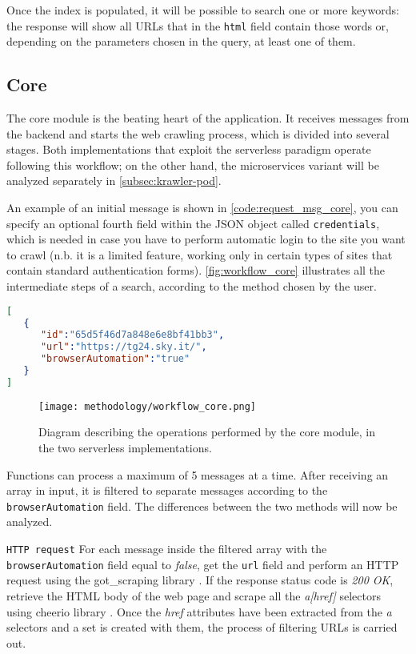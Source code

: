 \documentclass[../thesis.tex]{subfiles}
\begin{document}
Once the index is populated, it will be possible to search one or more keywords: the response will show all \acrshort{URL}s that in the \texttt{html} field contain those words or, depending on the parameters chosen in the query, at least one of them.

\subsection{Core}
The core module is the beating heart of the application. It receives messages from the backend and starts the web crawling process, which is divided into several stages. Both implementations that exploit the serverless paradigm operate following this workflow; on the other hand, the microservices variant will be analyzed separately in \autoref{subsec:krawler-pod}.

An example of an initial message is shown in \autoref{code:request_msg_core}, you can specify an optional fourth field within the \acrshort{JSON} object called \texttt{credentials}, which is needed in case you have to perform automatic login to the site you want to crawl (n.b. it is a limited feature, working only in certain types of sites that contain standard authentication forms). \autoref{fig:workflow_core} illustrates all the intermediate steps of a search, according to the method chosen by the user.

\begin{lstlisting}[language=json, captionpos=b, caption={[Sample initial message for the core]Example of an initial message received by the core module.}, label={code:request_msg_core}]
[
   {
      "id":"65d5f46d7a848e6e8bf41bb3",
      "url":"https://tg24.sky.it/",
      "browserAutomation":"true"
   }
]
\end{lstlisting}

\begin{figure}[H]
    \centering
    \texttt{[image: methodology/workflow\_core.png]}
    \caption[Core module workflow]{Diagram describing the operations performed by the core module, in the two serverless implementations.}
    \label{fig:workflow_core}
\end{figure}

Functions can process a maximum of 5 messages at a time. After receiving an array in input, it is filtered to separate messages according to the \texttt{browserAutomation} field. The differences between the two methods will now be analyzed.

\texttt{HTTP request} For each message inside the filtered array with the \texttt{browserAutomation} field equal to \textit{false}, get the \texttt{url} field and perform an \acrshort{HTTP} request using the \gls{got_scraping} library \cite{site:got_scraping}. If the response status code is \textit{200 OK}, retrieve the \acrshort{HTML} body of the web page and scrape all the \textit{a[href]} selectors using \gls{cheerio} library \cite{site:cheerio}. Once the \textit{href} attributes have been extracted from the \textit{a} selectors and a set is created with them, the process of filtering \acrshort{URL}s is carried out.
\end{document}
